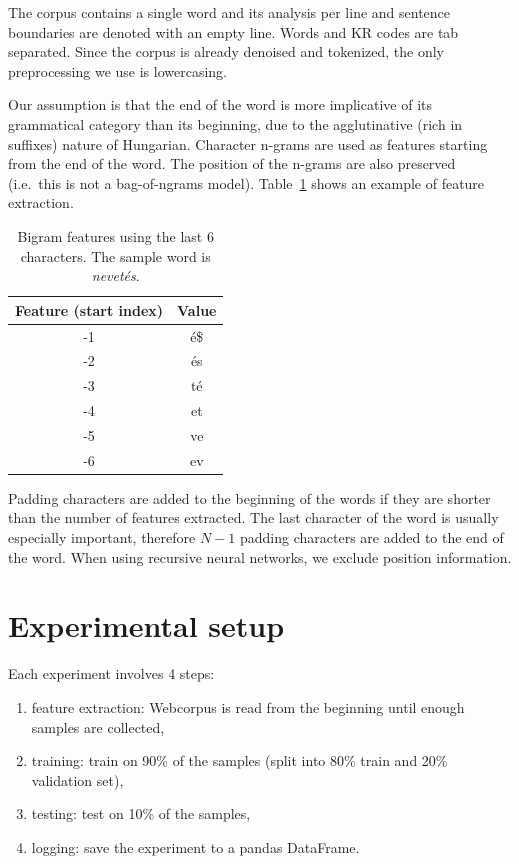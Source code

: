 \documentclass{article}
\begin{document}
The corpus contains a single word and its analysis per line and sentence boundaries are denoted with an empty line.
Words and KR codes are tab separated.
Since the corpus is already denoised and tokenized, the only preprocessing we use is lowercasing.

Our assumption is that the end of the word is more implicative of its grammatical category than its beginning, due to the agglutinative (rich in suffixes) nature of Hungarian.
Character n-grams are used as features starting from the end of the word.
The position of the n-grams are also preserved (i.e.~this is not a bag-of-ngrams model).
Table~\ref{table:feat_extract} shows an example of feature extraction.

\begin{table}[t]
    \caption{Bigram features using the last 6 characters. The sample word is \emph{nevetés}.}
  \label{table:feat_extract}
  \centering
  \begin{tabular}{cc}
      \toprule
      Feature (start index) & Value \\
      \midrule
      -1 & é\$ \\
      -2 & és \\
      -3 & té \\
      -4 & et \\
      -5 & ve \\
      -6 & ev \\
      \bottomrule
  \end{tabular}
\end{table}

Padding characters are added to the beginning of the words if they are shorter than the number of features extracted.
The last character of the word is usually especially important, therefore $N-1$ padding characters are added to the end of the word.
When using recursive neural networks, we exclude position information.

\section{Experimental setup}

Each experiment involves 4 steps:

\begin{enumerate}
    \item feature extraction: Webcorpus is read from the beginning until enough samples are collected,
    \item training: train on 90\% of the samples (split into 80\% train and 20\% validation set),
    \item testing: test on 10\% of the samples,
    \item logging: save the experiment to a pandas DataFrame.
\end{enumerate}
\end{document}

